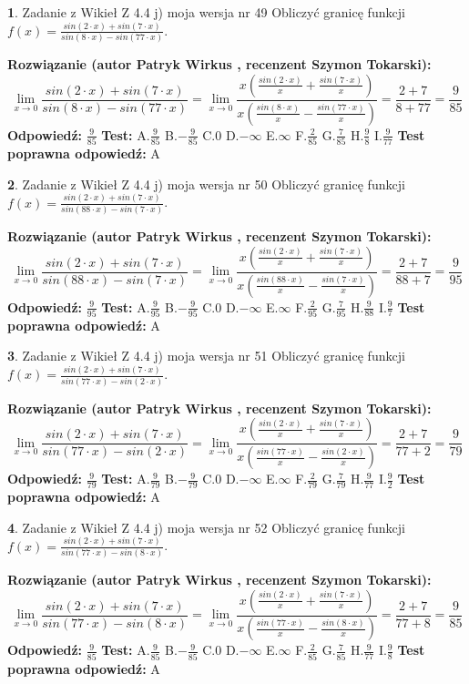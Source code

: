 \documentclass[12pt, a4paper]{article}
\theoremstyle{definition} %
\newtheorem{zad}{}
\newcommand{\zadStart}[1]{\begin{zad}#1\newline}
\newcommand{\zadStop}{\end{zad}}
\newcommand{\rozwStart}[2]{\noindent \textbf{Rozwiązanie (autor #1 , recenzent #2): }\newline}
\newcommand{\rozwStop}{\newline}
\newcommand{\odpStart}{\noindent \textbf{Odpowiedź:}\newline}
\newcommand{\odpStop}{\newline}
\newcommand{\testStart}{\noindent \textbf{Test:}\newline}
\newcommand{\testStop}{\newline}
\newcommand{\kluczStart}{\noindent \textbf{Test poprawna odpowiedź:}\newline}
\newcommand{\kluczStop}{\newline}
\begin{document}
\zadStart{Zadanie z Wikieł Z 4.4 j) moja wersja nr 49}
Obliczyć granicę funkcji $f(x)=\frac{sin(2\cdot x) +sin(7\cdot x)}{sin(8\cdot x) -sin(77\cdot x)}$.
\zadStop
\rozwStart{Patryk Wirkus}{Szymon Tokarski}
$$\lim\limits_{x\to 0}\frac{sin(2\cdot x) +sin(7\cdot x)}{sin(8\cdot x) -sin(77\cdot x)}=\lim\limits_{x\to 0}\frac{x(\frac{sin(2\cdot x)}{x}+\frac{sin(7\cdot x)}{x})}{x(\frac{sin(8\cdot x)}{x}-\frac{sin(77\cdot x)}{x})}=\frac{2+7}{8+77} = \frac{9}{85}$$
\rozwStop
\odpStart
$\frac{9}{85}$
\odpStop
\testStart
A.$\frac{9}{85}$
B.$-\frac{9}{85}$
C.$0$
D.$-\infty$
E.$\infty$
F.$\frac{2}{85}$
G.$\frac{7}{85}$
H.$\frac{9}{8}$
I.$\frac{9}{77}$
\testStop
\kluczStart
A
\kluczStop



\zadStart{Zadanie z Wikieł Z 4.4 j) moja wersja nr 50}
Obliczyć granicę funkcji $f(x)=\frac{sin(2\cdot x) +sin(7\cdot x)}{sin(88\cdot x) -sin(7\cdot x)}$.
\zadStop
\rozwStart{Patryk Wirkus}{Szymon Tokarski}
$$\lim\limits_{x\to 0}\frac{sin(2\cdot x) +sin(7\cdot x)}{sin(88\cdot x) -sin(7\cdot x)}=\lim\limits_{x\to 0}\frac{x(\frac{sin(2\cdot x)}{x}+\frac{sin(7\cdot x)}{x})}{x(\frac{sin(88\cdot x)}{x}-\frac{sin(7\cdot x)}{x})}=\frac{2+7}{88+7} = \frac{9}{95}$$
\rozwStop
\odpStart
$\frac{9}{95}$
\odpStop
\testStart
A.$\frac{9}{95}$
B.$-\frac{9}{95}$
C.$0$
D.$-\infty$
E.$\infty$
F.$\frac{2}{95}$
G.$\frac{7}{95}$
H.$\frac{9}{88}$
I.$\frac{9}{7}$
\testStop
\kluczStart
A
\kluczStop



\zadStart{Zadanie z Wikieł Z 4.4 j) moja wersja nr 51}
Obliczyć granicę funkcji $f(x)=\frac{sin(2\cdot x) +sin(7\cdot x)}{sin(77\cdot x) -sin(2\cdot x)}$.
\zadStop
\rozwStart{Patryk Wirkus}{Szymon Tokarski}
$$\lim\limits_{x\to 0}\frac{sin(2\cdot x) +sin(7\cdot x)}{sin(77\cdot x) -sin(2\cdot x)}=\lim\limits_{x\to 0}\frac{x(\frac{sin(2\cdot x)}{x}+\frac{sin(7\cdot x)}{x})}{x(\frac{sin(77\cdot x)}{x}-\frac{sin(2\cdot x)}{x})}=\frac{2+7}{77+2} = \frac{9}{79}$$
\rozwStop
\odpStart
$\frac{9}{79}$
\odpStop
\testStart
A.$\frac{9}{79}$
B.$-\frac{9}{79}$
C.$0$
D.$-\infty$
E.$\infty$
F.$\frac{2}{79}$
G.$\frac{7}{79}$
H.$\frac{9}{77}$
I.$\frac{9}{2}$
\testStop
\kluczStart
A
\kluczStop



\zadStart{Zadanie z Wikieł Z 4.4 j) moja wersja nr 52}
Obliczyć granicę funkcji $f(x)=\frac{sin(2\cdot x) +sin(7\cdot x)}{sin(77\cdot x) -sin(8\cdot x)}$.
\zadStop
\rozwStart{Patryk Wirkus}{Szymon Tokarski}
$$\lim\limits_{x\to 0}\frac{sin(2\cdot x) +sin(7\cdot x)}{sin(77\cdot x) -sin(8\cdot x)}=\lim\limits_{x\to 0}\frac{x(\frac{sin(2\cdot x)}{x}+\frac{sin(7\cdot x)}{x})}{x(\frac{sin(77\cdot x)}{x}-\frac{sin(8\cdot x)}{x})}=\frac{2+7}{77+8} = \frac{9}{85}$$
\rozwStop
\odpStart
$\frac{9}{85}$
\odpStop
\testStart
A.$\frac{9}{85}$
B.$-\frac{9}{85}$
C.$0$
D.$-\infty$
E.$\infty$
F.$\frac{2}{85}$
G.$\frac{7}{85}$
H.$\frac{9}{77}$
I.$\frac{9}{8}$
\testStop
\kluczStart
A
\kluczStop
\end{document}
